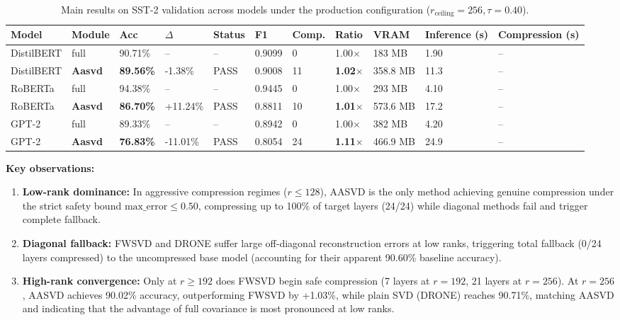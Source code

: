 \begin{table}[t]
\centering
\small
\begin{tabular}{lllllllllll}
\toprule
\textbf{Model} & \textbf{Module} & \textbf{Acc} & \textbf{$\Delta$} & \textbf{Status} & \textbf{F1} & \textbf{Comp.} & \textbf{Ratio} & \textbf{VRAM} & \textbf{Inference (s)} & \textbf{Compression (s)} \\
\midrule
DistilBERT & full & 90.71\% & -- & -- & 0.9099 & 0 & 1.00$\times$ & 183 MB & 1.90 & -- \\
DistilBERT & \textbf{Aasvd} & \textbf{89.56\%} & -1.38\% & PASS & 0.9008 & 11 & \textbf{1.02$\times$} & 358.8 MB & 11.3 & -- \\
RoBERTa & full & 94.38\% & -- & -- & 0.9445 & 0 & 1.00$\times$ & 293 MB & 4.10 & -- \\
RoBERTa & \textbf{Aasvd} & \textbf{86.70\%} & +11.24\% & PASS & 0.8811 & 10 & \textbf{1.01$\times$} & 573.6 MB & 17.2 & -- \\
GPT-2 & full & 89.33\% & -- & -- & 0.8942 & 0 & 1.00$\times$ & 382 MB & 4.20 & -- \\
GPT-2 & \textbf{Aasvd} & \textbf{76.83\%} & -11.01\% & PASS & 0.8054 & 24 & \textbf{1.11$\times$} & 466.9 MB & 24.9 & -- \\
\bottomrule
\end{tabular}
\caption{Main results on SST-2 validation across models under the production configuration ($r_{\mathrm{ceiling}}=256, \tau=0.40$).}
\label{tab:main_sst2}
\end{table}

\textbf{Key observations:}

\begin{enumerate}
\item \textbf{Low-rank dominance:} In aggressive compression regimes ($r \le 128$), AASVD is the only method achieving genuine compression under the strict safety bound $\text{max\_error} \le 0.50$, compressing up to 100\% of target layers (24/24) while diagonal methods fail and trigger complete fallback.
\item \textbf{Diagonal fallback:} FWSVD and DRONE suffer large off-diagonal reconstruction errors at low ranks, triggering total fallback (0/24 layers compressed) to the uncompressed base model (accounting for their apparent 90.60\% baseline accuracy).
\item \textbf{High-rank convergence:} Only at $r \ge 192$ does FWSVD begin safe compression (7 layers at $r=192$, 21 layers at $r=256$). At $r=256$, AASVD achieves 90.02\% accuracy, outperforming FWSVD by +1.03\%, while plain SVD (DRONE) reaches 90.71\%, matching AASVD and indicating that the advantage of full covariance is most pronounced at low ranks.
\end{enumerate}

